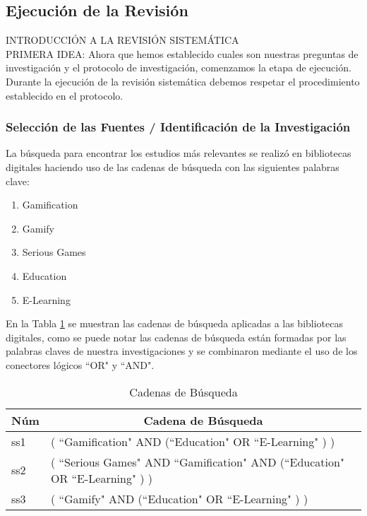 \documentclass[•]{article}
\begin{document}


\subsection{Ejecución de la Revisión}
    INTRODUCCIÓN A LA REVISIÓN SISTEMÁTICA\\    
    PRIMERA IDEA: Ahora que hemos establecido cuales son nuestras preguntas de investigación y el protocolo de investigación, comenzamos la etapa de ejecución. Durante la ejecución de la revisión sistemática debemos respetar el procedimiento establecido en el protocolo.

    \subsubsection{Selección de las Fuentes / Identificación de la Investigación}
    La búsqueda para encontrar los estudios más relevantes se realizó en bibliotecas digitales haciendo uso de las cadenas de búsqueda con las siguientes palabras clave:
    \begin{enumerate}
        \item Gamification
        \item Gamify
        \item Serious Games
        \item Education
        \item E-Learning
    \end{enumerate}
    En la Tabla \ref{table:SearchString} se muestran las cadenas de búsqueda aplicadas a las bibliotecas digitales, como se puede notar las cadenas de búsqueda están formadas por las palabras claves de nuestra investigaciones y se combinaron mediante el uso de los conectores lógicos ``OR"{ }y ``AND". \\

\begin{table}
    \begin{center}
        \caption{Cadenas de Búsqueda}
        \label{table:SearchString}
        \begin{tabular}{| p{0.6cm} | p{7cm} |}
            \toprule
            \hline
            \multicolumn{1}{|c|}{\textbf{Núm}} & \multicolumn{1}{|c|}{\textbf{Cadena de Búsqueda}} \\
            \hline
            ss1 & ( ``Gamification"{ }AND (``Education"{ }OR ``E-Learning"{ }) )\\
            \hline
            ss2 & ( ``Serious Games"{ }AND ``Gamification"{ }AND (``Education"{ }OR ``E-Learning"{ }) )\\
            \hline            
            ss3 & ( ``Gamify"{ }AND (``Education"{ }OR ``E-Learning"{ }) )\\
            \hline
        \end{tabular}
    \end{center}
\end{table}
\end{document}
